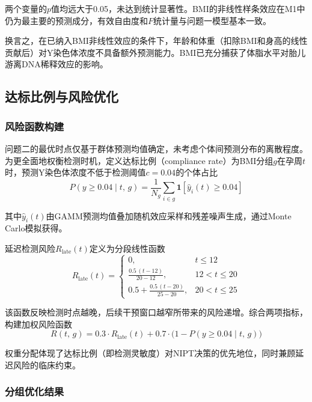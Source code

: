 两个变量的$p$值均远大于0.05，未达到统计显著性。BMI的非线性样条效应在M1中仍为最主要的预测成分，有效自由度和$F$统计量与问题一模型基本一致。

换言之，在已纳入BMI非线性效应的条件下，年龄和体重（扣除BMI和身高的线性贡献后）对Y染色体浓度不具备额外预测能力。BMI已充分捕获了体脂水平对胎儿游离DNA稀释效应的影响。

\subsection{达标比例与风险优化}

\subsubsection{风险函数构建}

问题二的最优时点仅基于群体预测均值确定，未考虑个体间预测分布的离散程度。为更全面地权衡检测时机，定义达标比例（compliance rate）为BMI分组$g$在孕周$t$时，预测Y染色体浓度不低于检测阈值$c=0.04$的个体占比
\begin{equation}\label{eq:compliance}
  P(y \geq 0.04 \mid t,\, g) = \frac{1}{N_g} \sum_{i \in g} \mathbf{1}\!\left[\hat{y}_i(t) \geq 0.04\right]
\end{equation}

其中$\hat{y}_i(t)$由GAMM预测均值叠加随机效应采样和残差噪声生成，通过Monte Carlo模拟获得。

延迟检测风险$R_{\text{late}}(t)$定义为分段线性函数
\begin{equation}\label{eq:late_risk}
  R_{\text{late}}(t) = \begin{cases}
    0, & t \leq 12 \\[4pt]
    \displaystyle\frac{0.5\,(t-12)}{20-12}, & 12 < t \leq 20 \\[6pt]
    \displaystyle 0.5 + \frac{0.5\,(t-20)}{25-20}, & 20 < t \leq 25
  \end{cases}
\end{equation}

该函数反映检测时点越晚，后续干预窗口越窄所带来的风险递增。综合两项指标，构建加权风险函数
\begin{equation}\label{eq:risk_func}
  R(t,\,g) = 0.3 \cdot R_{\text{late}}(t) + 0.7 \cdot \bigl(1 - P(y \geq 0.04 \mid t,\,g)\bigr)
\end{equation}

权重分配体现了达标比例（即检测灵敏度）对NIPT决策的优先地位，同时兼顾延迟风险的临床约束。

\subsubsection{分组优化结果}

